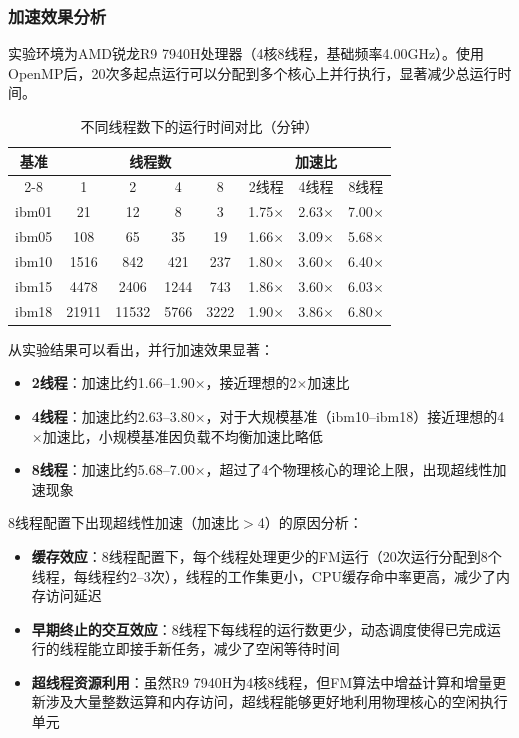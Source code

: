 \documentclass{SYSUReport}
\begin{document}
\subsubsection{加速效果分析}
实验环境为AMD锐龙R9 7940H处理器（4核8线程，基础频率4.00GHz）。使用OpenMP后，20次多起点运行可以分配到多个核心上并行执行，显著减少总运行时间。

\begin{table}[H]
\centering
\caption{不同线程数下的运行时间对比（分钟）}
\begin{tabular}{|c|c|c|c|c|c|c|c|}
\hline
\multirow{2}{*}{基准} & \multicolumn{4}{c|}{线程数} & \multicolumn{3}{c|}{加速比} \\
\cline{2-8}
 & 1 & 2 & 4 & 8 & 2线程 & 4线程 & 8线程 \\
\hline
ibm01 & 21 & 12 & 8 & 3 & 1.75$\times$ & 2.63$\times$ & 7.00$\times$ \\
\hline
ibm05 & 108 & 65 & 35 & 19 & 1.66$\times$ & 3.09$\times$ & 5.68$\times$ \\
\hline
ibm10 & 1516 & 842 & 421 & 237 & 1.80$\times$ & 3.60$\times$ & 6.40$\times$ \\
\hline
ibm15 & 4478 & 2406 & 1244 & 743 & 1.86$\times$ & 3.60$\times$ & 6.03$\times$ \\
\hline
ibm18 & 21911 & 11532 & 5766 & 3222 & 1.90$\times$ & 3.86$\times$ & 6.80$\times$ \\
\hline
\end{tabular}
\end{table}

从实验结果可以看出，并行加速效果显著：
\begin{itemize}
\item \textbf{2线程}：加速比约1.66--1.90$\times$，接近理想的2$\times$加速比
\item \textbf{4线程}：加速比约2.63--3.80$\times$，对于大规模基准（ibm10--ibm18）接近理想的4$\times$加速比，小规模基准因负载不均衡加速比略低
\item \textbf{8线程}：加速比约5.68--7.00$\times$，超过了4个物理核心的理论上限，出现超线性加速现象
\end{itemize}

8线程配置下出现超线性加速（加速比$>$4）的原因分析：
\begin{itemize}
\item \textbf{缓存效应}：8线程配置下，每个线程处理更少的FM运行（20次运行分配到8个线程，每线程约2--3次），线程的工作集更小，CPU缓存命中率更高，减少了内存访问延迟
\item \textbf{早期终止的交互效应}：8线程下每线程的运行数更少，动态调度使得已完成运行的线程能立即接手新任务，减少了空闲等待时间
\item \textbf{超线程资源利用}：虽然R9 7940H为4核8线程，但FM算法中增益计算和增量更新涉及大量整数运算和内存访问，超线程能够更好地利用物理核心的空闲执行单元
\end{itemize}
\end{document}
